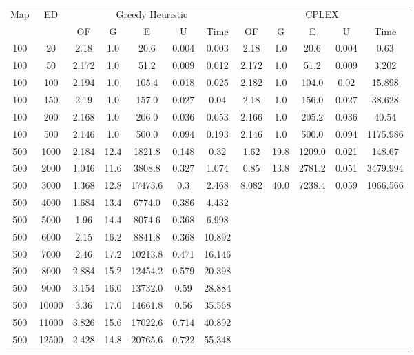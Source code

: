 \begin{table}[htb]
	\centering
	\begin{tabular}{|c|c|c|c|c|c|c|c|c|c|c|c|}
		\hline
		\multirow{2}{*}{Map} & \multirow{2}{*}{ED} & \multicolumn{5}{c|}{Greedy Heuristic} & \multicolumn{5}{c|}{CPLEX}\\ 
		\cline{3-12}
&& OF & G & E & U & Time & OF & G & E & U & Time\\ 
		\hline
		100 & 20 & 2.18 & 1.0 & 20.6 & 0.004 & 0.003 & 2.18 & 1.0 & 20.6 & 0.004 & 0.63 \\ 
		100 & 50 & 2.172 & 1.0 & 51.2 & 0.009 & 0.012 & 2.172 & 1.0 & 51.2 & 0.009 & 3.202 \\ 
		100 & 100 & 2.194 & 1.0 & 105.4 & 0.018 & 0.025 & 2.182 & 1.0 & 104.0 & 0.02 & 15.898 \\ 
		100 & 150 & 2.19 & 1.0 & 157.0 & 0.027 & 0.04 & 2.18 & 1.0 & 156.0 & 0.027 & 38.628 \\ 
		100 & 200 & 2.168 & 1.0 & 206.0 & 0.036 & 0.053 & 2.166 & 1.0 & 205.2 & 0.036 & 40.54 \\ 
		100 & 500 & 2.146 & 1.0 & 500.0 & 0.094 & 0.193 & 2.146 & 1.0 & 500.0 & 0.094 & 1175.986 \\ 
		500 & 1000 & 2.184 & 12.4 & 1821.8 & 0.148 & 0.32 & 1.62 & 19.8 & 1209.0 & 0.021 & 148.67 \\ 
		500 & 2000 & 1.046 & 11.6 & 3808.8 & 0.327 & 1.074 & 0.85 & 13.8 & 2781.2 & 0.051 & 3479.994 \\ 
		500 & 3000 & 1.368 & 12.8 & 17473.6 & 0.3 & 2.468 & 8.082 & 40.0 & 7238.4 & 0.059 & 1066.566 \\ 
		500 & 4000 & 1.684 & 13.4 & 6774.0 & 0.386 & 4.432 & & & & &  \\ 
		500 & 5000 & 1.96 & 14.4 & 8074.6 & 0.368 & 6.998 & & & & &  \\ 
		500 & 6000 & 2.15 & 16.2 & 8841.8 & 0.368 & 10.892 & & & & &  \\ 
		500 & 7000 & 2.46 & 17.2 & 10213.8 & 0.471 & 16.146 & & & & &  \\ 
		500 & 8000 & 2.884 & 15.2 & 12454.2 & 0.579 & 20.398 & & & & &  \\ 
		500 & 9000 & 3.154 & 16.0 & 13732.0 & 0.59 & 28.884 & & & & &  \\ 
		500 & 10000 & 3.36 & 17.0 & 14661.8 & 0.56 & 35.568 & & & & &  \\ 
		500 & 11000 & 3.826 & 15.6 & 17022.6 & 0.714 & 40.892 & & & & &  \\ 
		500 & 12500 & 2.428 & 14.8 & 20765.6 & 0.722 & 55.348 & & & & &  \\ 

\end{tabular}
\end{table}
